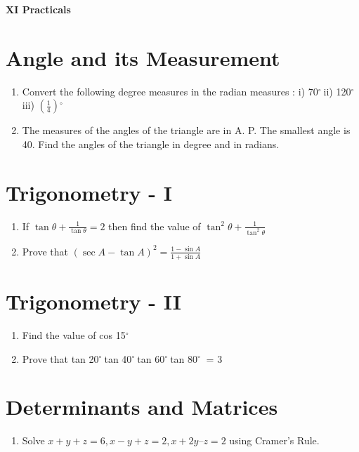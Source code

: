 \documentclass[14pt]{article}
\newcommand{\degree}{$^{\circ}\ $} %
\begin{document}
\centering 
{\large \bf XI Practicals\par}
\vspace{1cm}
\begin{multicols}{2}

\section{Angle and its Measurement}
\noindent
\begin{enumerate}

\item Convert the following degree measures
in the radian measures : i) 70\degree ii) 120\degree iii) $\left(\frac{1}{4}\right)$\degree

\item The measures of the angles of the
triangle are in A. P. The smallest angle
is 40. Find the angles of the triangle in
degree and in radians.

\end{enumerate} 

\section{Trigonometry - I}
\noindent
\begin{enumerate}
\item If $\tan \theta + \frac{1}{\tan \theta}=2$ then find the value of $\tan^2\theta + \frac{1}{\tan^2\theta}$ 

\item  Prove that $(\sec A - \tan A)^2=\frac{1-\sin A}{1+\sin A}$
\end{enumerate}

\section{Trigonometry - II}
\noindent
\begin{enumerate}
\item Find the value of cos 15\degree

\item Prove that tan 20\degree tan 40\degree tan 60\degree tan 80\degree
= 3 

\end{enumerate} 

\section{ Determinants and Matrices}
\noindent
\begin{enumerate}
\item Solve $
x+y+z = 6,  x-y+z = 2,  x+2y–z = 2$ using Cramer's Rule.


\end{enumerate}
\end{multicols}
\end{document}
